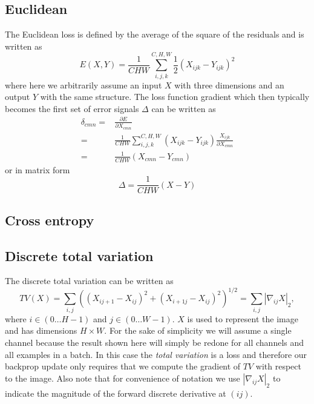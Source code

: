 \documentclass[a4paper]{article}
\begin{document}
\subsection{Euclidean}
The Euclidean loss is defined by the average of the square of the residuals and is written as
\begin{equation}
E(X,Y) = \frac{1}{CHW}\sum_{i,j,k}^{C,H,W} \frac{1}{2}\left (  X_{ijk} - Y_{ijk}\right )^2
\end{equation}
where here we arbitrarily assume an input $X$ with three dimensions and an output $Y$ with the same structure. 
The loss function gradient which then typically becomes the first set of error signals $\Delta$ can be written as
\begin{align}
\delta_{cmn} 
= &\frac{\partial E}{\partial X_{cmn}} \\
= &\frac{1}{CHW}\sum_{i,j,k}^{C,H,W} \left (  X_{ijk} - Y_{ijk}\right ) \frac{X_{ijk}}{\partial X_{cmn}} \\
= &\frac{1}{CHW}\left (  X_{cmn} - Y_{cmn}\right )
\end{align}
or in matrix form
\begin{equation}
\Delta = \frac{1}{CHW}\left (  X - Y\right )
\end{equation}
\subsection{Cross entropy}
\subsection{Discrete total variation}

The discrete total variation can be written as 
\begin{equation}
TV(X)= \sum_{i,j} \left ( \left ( X_{ij+1}-X_{ij}\right )^2 + \left ( X_{i+1j}-X_{ij}\right )^2 \right )^{1/2}= \sum_{i,j} \left | \nabla_{ij} X \right |_2 ,
\end{equation}
where $i \in (0\dots H-1)$ and $j \in (0\dots W-1)$. $X$ is used to represent the image and has dimensions $H \times W$. For the sake of simplicity we will assume a single channel because the result shown here will simply be redone for all channels and all examples in a batch. In this case the {\it total variation} is a loss and therefore our backprop update only requires that we compute the gradient of $TV$ with respect to the image. Also note that for convenience of notation we use $\left | \nabla_{ij} X \right |_2$ to indicate the magnitude of the forward discrete derivative at $(ij)$.
\end{document}
